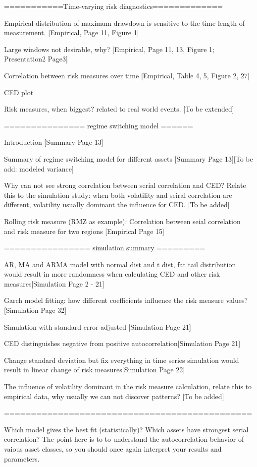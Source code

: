 \documentclass[11pt]{article}
\begin{document}
===========Time-varying risk diagnostics=============

Empirical distribution of maximum drawdown is sensitive to the time length of measurement. [Empirical, Page 11, Figure 1]

Large windows not desirable, why? [Empirical, Page 11, 13, Figure 1; Presentation2 Page3]

Correlation between risk measures over time [Empirical, Table 4, 5, Figure 2, 27]

CED plot

Risk measures, when biggest? related to real world events. [To be extended]

=============== regime switching model ======

Introduction [Summary Page 13]

Summary of regime switching model for different assets [Summary Page 13][To be add: modeled variance]

Why can not see strong correlation between serial correlation and CED? Relate this to the simulation study: when both volatility and seiral correlation are different, volatility usually dominant the influence for CED. [To be added]

Rolling risk measure (RMZ as example): Correlation between seial correlation and risk measure for two regions [Empirical Page 15]

================ simulation summary =========

AR, MA and ARMA model with normal dist and t dist, fat tail distribution would result in more randomness when calculating CED and other risk measures[Simulation Page 2 - 21]

Garch model fitting: how different coefficients influence the risk measure values? [Simulation Page 32]

Simulation with standard error adjusted [Simulation Page 21]

CED distinguishes negative from positive autocorrelation[Simulation Page 21]

Change standard deviation but fix everything in time series simulation would result in linear change of risk measures[Simulation Page 22]

The influence of volatility dominant in the risk measure calculation, relate this to empirical data, why usually we can not discover patterns? [To be added] 

==============================================

Which model gives the best fit (statistically)? Which assets have strongest serial correlation? The point here is to to understand the autocorrelation behavior of vaious asset classes, so you should once again interpret your results and parameters.
\end{document}

